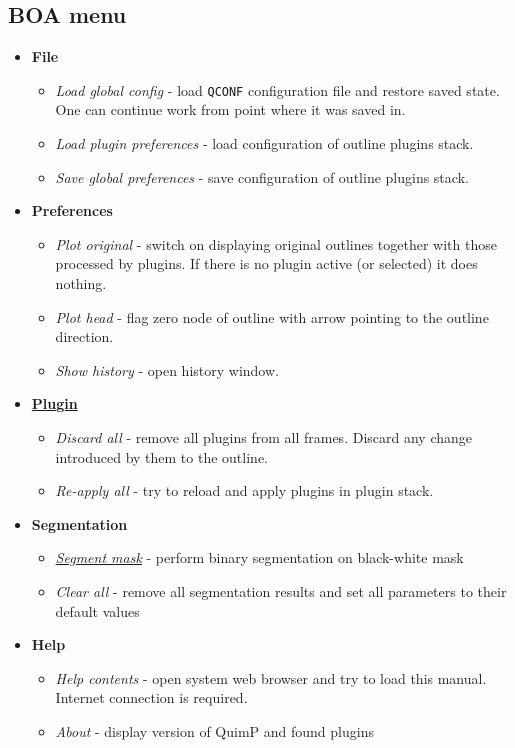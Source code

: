 \documentclass[a4paper,12pt]{article}
\begin{document}
\subsection{BOA menu}
\begin{itemize}
	\item \textbf{File}
	\begin{itemize}
		\item \textit{Load global config} - load \texttt{QCONF} configuration file and restore saved state. One can continue work from point where it was saved in.
		\item \textit{Load plugin preferences} - load configuration of outline plugins stack.  
		\item \textit{Save global preferences} - save configuration of outline plugins stack.
	\end{itemize}
	\item \textbf{Preferences}
	\begin{itemize}
		\item \textit{Plot original} - switch on displaying original outlines together with those processed by plugins. If there is no plugin active (or selected) it does nothing.
		\item \textit{Plot head} - flag zero node of outline with arrow pointing to the outline direction.
		\item \textit{Show history} - open history window.
	\end{itemize}
	\item \hyperref[sec:QuimP_preplugins]{\textbf{Plugin}}
	\begin{itemize}
		\item \textit{Discard all} - remove all plugins from all frames. Discard any change introduced by them to the outline.
		\item \textit{Re-apply all} - try to reload and apply plugins in plugin stack.
	\end{itemize}
	\item \textbf{Segmentation}
	\begin{itemize}
		\item \hyperref[sec:Binary_seg]{\textit{Segment mask}} - perform binary segmentation on black-white mask 
		\item \textit{Clear all} - remove all segmentation results and set all parameters to their default values
	\end{itemize}
	\item \textbf{Help}
	\begin{itemize}
		\item \textit{Help contents} - open system web browser and try to load this manual. Internet connection is required. 
		\item \textit{About} - display version of QuimP and found plugins
	\end{itemize}
\end{itemize}
\end{document}
